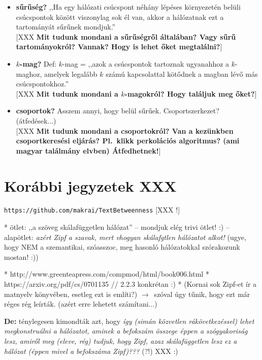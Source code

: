 \documentclass{llncs}
\newcommand{\nyil}{$\rightarrow$\ }
\newcommand{\code}[1]{\texttt{\small #1}}
\newcommand{\embf}[1]{\textbf{#1}}
\newcommand{\XXX}[1]{{\small \color{megjcolor} [XXX #1]}}
\newcommand{\XXXb}[1]{\XXX{\embf{#1}}}
\newcommand{\XXXf}{\XXX{!}\ }
\newcommand{\smp}[1]{{\small (#1)}}
\begin{document}
\begin{itemize}
\begin{itemize}
\end{itemize}

\item 
\embf{sűrűség?} 
,,Ha egy hálózati csúcspont néhány lépéses környezetén belüli csúcspontok között viszonylag sok él van, akkor a hálózatnak ezt a tartományát sűrűnek mondjuk.''\\
\XXXb{Mit tudunk mondani a sűrűségről általában? Vagy sűrű tartományokról? Vannak? Hogy is lehet őket megtalálni?}

\item
\embf{$k$-mag?}
Def: $k$-mag = ,,azok a csúcspontok tartoznak ugyanahhoz a $k$-maghoz, amelyek legalább $k$ számú kapcsolattal kötődnek a magban lévő más csúcspontokhoz.''\\
\XXXb{Mit tudunk mondani a $k$-magokról? Hogy találjuk meg őket?}

\item
\embf{csoportok?}
Asszem annyi, hogy belül sűrűek. Csoportszerkezet? (átfedések...)\\
\XXXb{Mit tudunk mondani a csoportokról?
Van a kezünkben csoportkeresési eljárás?
Pl.\ klikk perkolációs algoritmus? (ami magyar találmány elvben)
Átfedhetnek!}

\end{itemize}


\section{Korábbi jegyzetek XXX}

\code{https://github.com/makrai/TextBetweenness} \XXXf

 * ötlet: ,,a szöveg skálafüggetlen hálózat'' -- mondjuk elég trivi ötlet! :)
 -- alapötlet:
    \emph{azért Zipf a szavak, mert vhogyan skálafgtlen hálózatot alkot!}
    \smp{ugye, hogy NEM a szemantikai, szóasszoc, meg hasonló hálózatokkal
         szórakozunk mostan! :)}

 * http://www.greenteapress.com/compmod/html/book006.html
 * https://arxiv.org/pdf/cs/0701135 // 2.2.3 konkrétan :)
 * (Kornai sok Zipf-et ír a matnyelv könyvében, esetleg ezt is említi?)
 \nyil szóval úgy tűnik, hogy ezt már réges rég leírták.
    (azért erre lehetett számítani...)

 \embf{De:} ténylegesen kimondták azt, hogy
 \emph{így (simán közvetlen rákövetkezéssel)
 lehet megkonstruálni a hálózatot, aminek a befokszám összege
 éppen a szógyakoriság lesz, amiről meg (eleve, rég) tudjuk, hogy Zipf,
 azaz skálafüggetlen lesz ez a hálózat
 (éppen mivel a befokszáma Zipf)???} (?!) XXX :)
\end{document}
